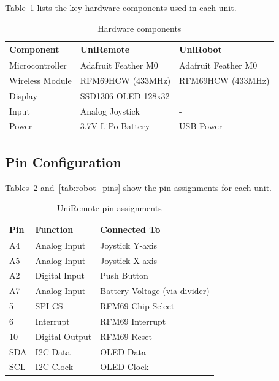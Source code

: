 Table~\ref{tab:hardware_components} lists the key hardware components used in each unit.

\begin{table}[H]
    \centering
    \caption{Hardware components}
    \label{tab:hardware_components}
    \begin{tabular}{|l|l|l|}
        \hline
        \textbf{Component} & \textbf{UniRemote} & \textbf{UniRobot} \\
        \hline
        Microcontroller & Adafruit Feather M0 & Adafruit Feather M0 \\
        Wireless Module & RFM69HCW (433MHz) & RFM69HCW (433MHz) \\
        Display & SSD1306 OLED 128x32 & - \\
        Input & Analog Joystick & - \\
        Power & 3.7V LiPo Battery & USB Power \\
        \hline
    \end{tabular}
\end{table}

\subsection{Pin Configuration}

Tables~\ref{tab:remote_pins} and~\ref{tab:robot_pins} show the pin assignments for each unit.

\begin{table}[H]
    \centering
    \caption{UniRemote pin assignments}
    \label{tab:remote_pins}
    \begin{tabular}{|l|l|l|}
        \hline
        \textbf{Pin} & \textbf{Function} & \textbf{Connected To} \\
        \hline
        A4 & Analog Input & Joystick Y-axis \\
        A5 & Analog Input & Joystick X-axis \\
        A2 & Digital Input & Push Button \\
        A7 & Analog Input & Battery Voltage (via divider) \\
        5 & SPI CS & RFM69 Chip Select \\
        6 & Interrupt & RFM69 Interrupt \\
        10 & Digital Output & RFM69 Reset \\
        SDA & I2C Data & OLED Data \\
        SCL & I2C Clock & OLED Clock \\
        \hline
    \end{tabular}
\end{table}


